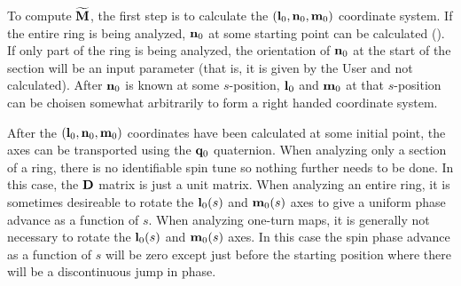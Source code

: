 {To compute $\widetilde{{\bf M}}$, the first step is to calculate the $({\bf l}_0, {\bf n}_0, {\bf m}_0)$ coordinate
system. If the entire ring is being analyzed, ${\bf n}_0$ at some starting point can be calculated
().  If only part of the ring is being analyzed, the orientation of ${\bf n}_0$ at the
start of the section will be an input parameter (that is, it is given by the User and not
calculated). After ${\bf n}_0$ is known at some $s$-position, ${\bf l}_0$ and ${\bf m}_0$ at that
$s$-position can be choisen somewhat arbitrarily to form a right handed coordinate system.

After the $({\bf l}_0, {\bf n}_0, {\bf m}_0)$ coordinates have been calculated at some initial point, the
axes can be transported using the ${\bf q}_0$ quaternion. When analyzing only a section of a ring,
there is no identifiable spin tune so nothing further needs to be done. In this case, the ${\bf D}$
matrix is just a unit matrix. When analyzing an entire ring, it is sometimes desireable to rotate
the ${\bf l}_0(s)$ and ${\bf m}_0(s)$ axes to give a uniform phase advance as a function of $s$.  When
analyzing one-turn maps, it is generally not necessary to rotate the ${\bf l}_0(s)$ and ${\bf m}_0(s)$
axes. In this case the spin phase advance as a function of $s$ will be zero except just before the
starting position where there will be a discontinuous jump in phase.

}
